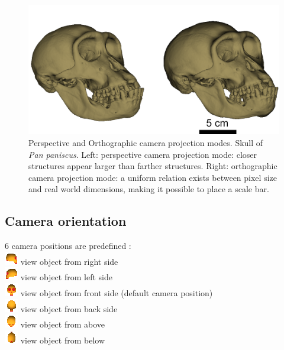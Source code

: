 \begin{figure}
  \centering
  \includegraphics[scale=0.3]{images/06/camera/camera_ortho_example.png} 
	\caption{Perspective and Orthographic camera projection modes. Skull of \textit{Pan paniscus}. Left: perspective camera projection mode: closer structures appear larger than farther structures. Right: orthographic camera projection mode: a uniform relation exists between pixel size and real world dimensions, making it possible to place a scale bar. }
\label{camera_ortho_example}
 
\end{figure}


\subsection{Camera orientation}
6 camera positions are predefined :\\
\includegraphics[scale=0.7]{images/06/camera/camera_right.png} view object from right side \\
\includegraphics[scale=0.7]{images/06/camera/camera_left.png} view object from left side\\
\includegraphics[scale=0.7]{images/06/camera/camera_front.png} view object from front side (default camera position)\\
\includegraphics[scale=0.7]{images/06/camera/camera_back.png} view object from back side\\
\includegraphics[scale=0.7]{images/06/camera/camera_above.png} view object from above\\
\includegraphics[scale=0.7]{images/06/camera/camera_below.png} view object from below\\

